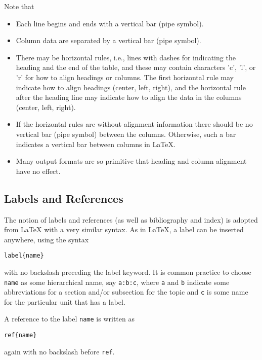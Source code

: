 \documentclass[%
oneside,                 %
final,                   %
10pt]{article}
\begin{document}
Note that

\begin{itemize}
 \item Each line begins and ends with a vertical bar (pipe symbol).

 \item Column data are separated by a vertical bar (pipe symbol).

 \item There may be horizontal rules, i.e., lines with dashes for
   indicating the heading and the end of the table, and these may
   contain characters 'c', 'l', or 'r' for how to align headings or
   columns. The first horizontal rule may indicate how to align
   headings (center, left, right), and the horizontal rule after the
   heading line may indicate how to align the data in the columns
   (center, left, right).

 \item If the horizontal rules are without alignment information there should
   be no vertical bar (pipe symbol) between the columns. Otherwise, such
   a bar indicates a vertical bar between columns in {\LaTeX}.

 \item Many output formats are so primitive that heading and column alignment
   have no effect.
\end{itemize}

\noindent
\subsection{Labels and References}

The notion of labels and references (as well as bibliography and index)
is adopted
from {\LaTeX} with a very similar syntax. As in {\LaTeX}, a label can be
inserted anywhere, using the syntax
\begin{Verbatim}[numbers=none,fontsize=\fontsize{9pt}{9pt},baselinestretch=0.85,xleftmargin=0mm]
label{name}
\end{Verbatim}
with no backslash
preceding the label keyword. It is common practice to choose \Verb!name!
as some hierarchical name, say \Verb!a:b:c!, where \Verb!a! and \Verb!b! indicate
some abbreviations for a section and/or subsection for the topic and
\Verb!c! is some name for the particular unit that has a label.

A reference to the label \Verb!name! is written as
\begin{Verbatim}[numbers=none,fontsize=\fontsize{9pt}{9pt},baselinestretch=0.85,xleftmargin=0mm]
ref{name}
\end{Verbatim}
again with no backslash before \Verb!ref!.
\end{document}
